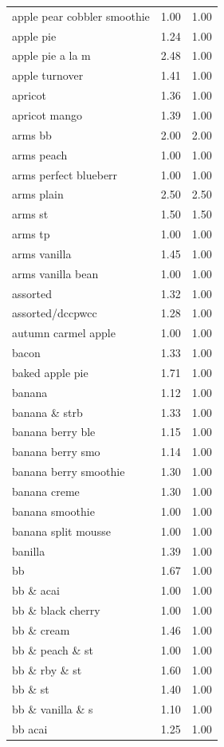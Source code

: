 \begin{table}
\begin{tabular}{lrr}
apple pear cobbler smoothie & 1.00 & 1.00 \\
apple pie & 1.24 & 1.00 \\
apple pie a la m & 2.48 & 1.00 \\
apple turnover & 1.41 & 1.00 \\
apricot & 1.36 & 1.00 \\
apricot mango & 1.39 & 1.00 \\
arms bb & 2.00 & 2.00 \\
arms peach & 1.00 & 1.00 \\
arms perfect blueberr & 1.00 & 1.00 \\
arms plain & 2.50 & 2.50 \\
arms st & 1.50 & 1.50 \\
arms tp & 1.00 & 1.00 \\
arms vanilla & 1.45 & 1.00 \\
arms vanilla bean & 1.00 & 1.00 \\
assorted & 1.32 & 1.00 \\
assorted/dccpwcc & 1.28 & 1.00 \\
autumn carmel apple & 1.00 & 1.00 \\
bacon & 1.33 & 1.00 \\
baked apple pie & 1.71 & 1.00 \\
banana & 1.12 & 1.00 \\
banana \& strb & 1.33 & 1.00 \\
banana berry ble & 1.15 & 1.00 \\
banana berry smo & 1.14 & 1.00 \\
banana berry smoothie & 1.30 & 1.00 \\
banana creme & 1.30 & 1.00 \\
banana smoothie & 1.00 & 1.00 \\
banana split mousse & 1.00 & 1.00 \\
banilla & 1.39 & 1.00 \\
bb & 1.67 & 1.00 \\
bb \& acai & 1.00 & 1.00 \\
bb \& black cherry & 1.00 & 1.00 \\
bb \& cream & 1.46 & 1.00 \\
bb \& peach \& st & 1.00 & 1.00 \\
bb \& rby \& st & 1.60 & 1.00 \\
bb \& st & 1.40 & 1.00 \\
bb \& vanilla \& s & 1.10 & 1.00 \\
bb acai & 1.25 & 1.00 \\

\end{tabular}
\end{table}
